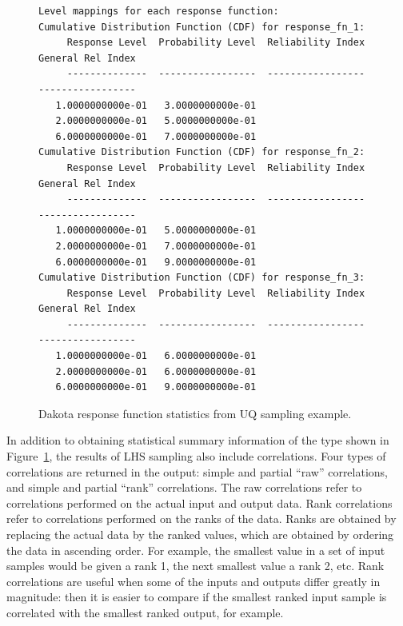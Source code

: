 \begin{figure}[htbp!]
\begin{bigbox}
\begin{small}
\begin{verbatim}
Level mappings for each response function:
Cumulative Distribution Function (CDF) for response_fn_1:
     Response Level  Probability Level  Reliability Index  General Rel Index
     --------------  -----------------  -----------------  -----------------
   1.0000000000e-01   3.0000000000e-01
   2.0000000000e-01   5.0000000000e-01
   6.0000000000e-01   7.0000000000e-01
Cumulative Distribution Function (CDF) for response_fn_2:
     Response Level  Probability Level  Reliability Index  General Rel Index
     --------------  -----------------  -----------------  -----------------
   1.0000000000e-01   5.0000000000e-01
   2.0000000000e-01   7.0000000000e-01
   6.0000000000e-01   9.0000000000e-01
Cumulative Distribution Function (CDF) for response_fn_3:
     Response Level  Probability Level  Reliability Index  General Rel Index
     --------------  -----------------  -----------------  -----------------
   1.0000000000e-01   6.0000000000e-01
   2.0000000000e-01   6.0000000000e-01
   6.0000000000e-01   9.0000000000e-01
\end{verbatim}
\end{small}
\end{bigbox}
\caption{Dakota response function statistics from UQ sampling example.}
\label{uq:figure03}
\end{figure}

In addition to obtaining statistical summary information of the type
shown in Figure~\ref{uq:figure03}, the results of LHS sampling also
include correlations. Four types of correlations are returned in the
output: simple and partial ``raw'' correlations, and simple and
partial ``rank'' correlations. The raw correlations refer to
correlations performed on the actual input and output data. Rank
correlations refer to correlations performed on the ranks of the data.
Ranks are obtained by replacing the actual data by the ranked values,
which are obtained by ordering the data in ascending order. For
example, the smallest value in a set of input samples would be given a
rank 1, the next smallest value a rank 2, etc. Rank correlations are
useful when some of the inputs and outputs differ greatly in
magnitude: then it is easier to compare if the smallest ranked input
sample is correlated with the smallest ranked output, for example.

